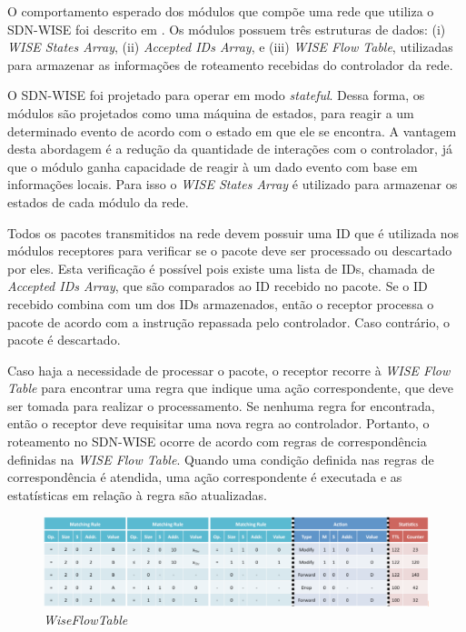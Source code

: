O comportamento esperado dos módulos que compõe uma rede que utiliza o \ac{SDN-WISE} foi descrito em . Os módulos possuem três estruturas de dados: (i) \textit{WISE States Array}, (ii) \textit{Accepted IDs Array}, e (iii) \textit{WISE Flow Table}, utilizadas para armazenar as informações de roteamento recebidas do controlador da rede. 

O \ac{SDN-WISE} foi projetado para operar em modo \textit{stateful}. Dessa forma, os módulos são projetados como uma máquina de estados, para reagir a um determinado evento de acordo com o estado em que ele se encontra. A vantagem desta abordagem é a redução da quantidade de interações com o controlador, já que o módulo ganha capacidade de reagir à um dado evento com base em informações locais. Para isso o \textit{WISE States Array} é utilizado para armazenar os estados de cada módulo da rede. 

Todos os pacotes transmitidos na rede devem possuir uma \ac{ID} que é utilizada nos módulos receptores para verificar se o pacote deve ser processado ou descartado por eles. Esta verificação é possível pois existe uma lista de \ac{ID}s, chamada de \textit{Accepted IDs Array}, que são comparados ao \ac{ID} recebido no pacote. Se o \ac{ID} recebido combina com um dos \ac{ID}s armazenados, então o receptor processa o pacote de acordo com a instrução repassada pelo controlador. Caso contrário, o pacote é descartado. 

Caso haja a necessidade de processar o pacote, o receptor recorre à \textit{WISE Flow Table} para encontrar uma regra que indique uma ação correspondente, que deve ser tomada para realizar o processamento. Se nenhuma regra for encontrada, então o receptor deve requisitar uma nova regra ao controlador. Portanto, o roteamento no \ac{SDN-WISE} ocorre de acordo com regras de correspondência definidas na \textit{WISE Flow Table}. Quando uma condição definida nas regras de correspondência é atendida, uma ação correspondente é executada e as estatísticas em relação à regra são atualizadas. 

\begin{figure}[h!]
    \centering
    \includegraphics[width=16cm]{figs/WiseFlowTable.png}
    \caption{\textit{WiseFlowTable} \cite{galluccio2015sdn}}
    \label{WiseFlowTable}
\end{figure}

